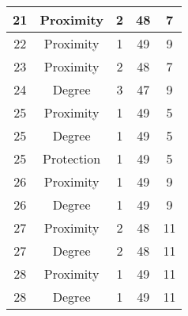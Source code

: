 \documentclass[results.tex]{subfiles}
\begin{document}
\begin{center}
\begin{tabular}{| c || c | c | c | c |}
            \hline
            21                      & Proximity                    & 2                      & 48                      & 7                    \\
            \hline
            22                      & Proximity                    & 1                      & 49                      & 9                    \\
            \hline
            23                      & Proximity                    & 2                      & 48                      & 7                    \\
            \hline
            24                      & Degree                       & 3                      & 47                      & 9                    \\
            \hline
            25                      & Proximity                    & 1                      & 49                      & 5                    \\
            \hline
            25                      & Degree                       & 1                      & 49                      & 5                    \\
            \hline
            25                      & Protection                   & 1                      & 49                      & 5                    \\
            \hline
            26                      & Proximity                    & 1                      & 49                      & 9                    \\
            \hline
            26                      & Degree                       & 1                      & 49                      & 9                    \\
            \hline
            27                      & Proximity                    & 2                      & 48                      & 11                   \\
            \hline
            27                      & Degree                       & 2                      & 48                      & 11                   \\
            \hline
            28                      & Proximity                    & 1                      & 49                      & 11                   \\
            \hline
            28                      & Degree                       & 1                      & 49                      & 11                   \\

\end{tabular}
\end{center}
\end{document}
